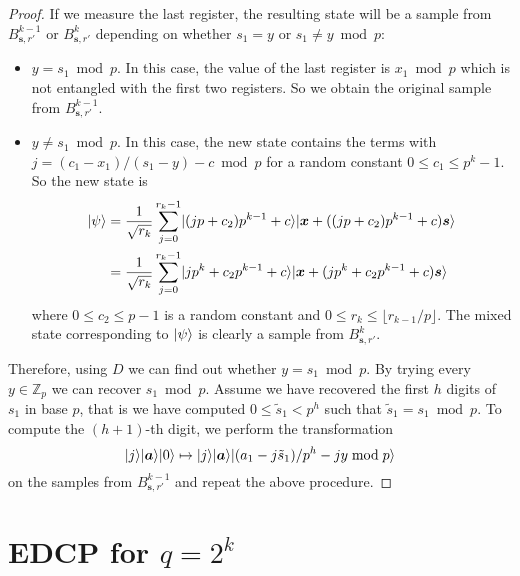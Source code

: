 \documentclass[11pt]{article}
\theoremstyle{plain}
\theoremstyle{definition}
\DeclarePairedDelimiter{\ldbrac}{\lvert}{\rangle}
\def\Z{\ensuremath{\mathbb{Z}}}
\begin{document}
\begin{proof}
    If we measure the last register, the resulting state will be a sample from $B_{\bm{s}, r'}^{k - 1}$ or $B_{\bm{s}, r'}^k$ depending on whether $s_1 = y$ or $s_1 \ne y \bmod p$:
    \begin{itemize}
    \item $y = s_1 \bmod p$. In this case, the value of the last register is $x_1 \bmod p$ which is not entangled with the first two registers. So we obtain the original sample from $B_{\bm{s}, r'}^{k - 1}$.
    \item $y \ne s_1 \bmod p$. In this case, the new state contains the terms with $j = (c_1 - x_1) / (s_1 - y) - c \bmod p$ for a random constant $0 \le c_1 \le p^k - 1$. So the new state is
    \begin{align*}
        \ldbrac{\psi}
        & = \frac{1}{\sqrt{r_k}} \sum_{j = 0}^{r_k - 1} \ldbrac{(jp + c_2)p^{k - 1} + c}\ldbrac{\bm{x} + ((jp + c_2)p^{k - 1} + c)\bm{s}} \\
        & = \frac{1}{\sqrt{r_k}} \sum_{j = 0}^{r_k - 1} \ldbrac{jp^k + c_2p^{k - 1} + c}\ldbrac{\bm{x} + (jp^k + c_2p^{k - 1} + c)\bm{s}}
    \end{align*}
    where $0 \le c_2 \le p - 1$ is a random constant and $0 \le r_k \le \lfloor r_{k - 1} / p \rfloor$. The mixed state corresponding to $\ldbrac{\psi}$ is clearly a sample from $B_{\bm{s}, r'}^k$.
    \end{itemize}
    Therefore, using $D$ we can find out whether $y = s_1 \bmod p$. By trying every $y \in \Z_p$ we can recover $s_1 \bmod p$. Assume we have recovered the first $h$ digits of $s_1$ in base $p$, that is we have computed $0 \le \tilde{s}_1 < p^h$ such that $\tilde{s}_1 = s_1 \bmod p$. To compute the $(h + 1)$-th digit, we perform the transformation
    \[ \ldbrac{j}\ldbrac{\bm{a}}\ldbrac{0} \mapsto \ldbrac{j}\ldbrac{\bm{a}}\ldbrac{(a_1 - j\tilde{s}_1) / p^h - jy \bmod p}  \]
    on the samples from $B_{\bm{s}, r'}^{k - 1}$ and repeat the above procedure.
\end{proof}





\section{EDCP for \boldmath${q = 2^k}$\unboldmath}
\end{document}
